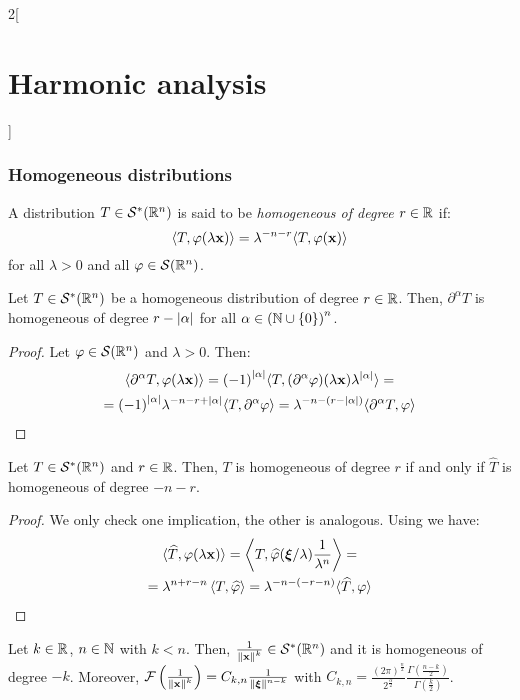 \documentclass[../../../main_math.tex]{subfiles}
\begin{document}
\begin{multicols}{2}[\section{Harmonic analysis}]
  \subsubsection{Homogeneous distributions}
  \begin{definition}
    A distribution $T\in \mathcal{S}^*(\mathbb{R}^n)$ is said to be \emph{homogeneous of degree $r\in \mathbb{R}$} if:
    $$
      \langle T,\varphi(\lambda\boldsymbol{\mathrm{x}})\rangle=\lambda^{- n -r}\langle T,\varphi(\boldsymbol{\mathrm{x}})\rangle
    $$
    for all $\lambda>0$ and all $\varphi\in \mathcal{S}(\mathbb{R}^n)$.
  \end{definition}
  \begin{proposition}
    Let $T\in \mathcal{S}^*(\mathbb{R}^n)$ be a homogeneous distribution of degree $r\in\mathbb{R}$. Then, $\partial^\alpha T$ is homogeneous of degree $r-\abs{\alpha}$ for all $\alpha\in{(\ensuremath{\mathbb{N}}\cup\{0\})}^n$.
  \end{proposition}
  \begin{proof}
    Let $\varphi\in \mathcal{S}(\mathbb{R}^n)$ and $\lambda>0$. Then:
    \begin{multline*}
      \langle \partial^\alpha T,\varphi(\lambda\boldsymbol{\mathrm{x}})\rangle={(-1)}^{\abs{\alpha}}\langle T,(\partial^\alpha\varphi)(\lambda\boldsymbol{\mathrm{x}})\lambda^{\abs{\alpha}}\rangle=\\={(-1)}^{\abs{\alpha}}\lambda^{-n-r+\abs{\alpha}}\langle T,\partial^\alpha\varphi\rangle=\lambda^{-n-(r-\abs{\alpha})}\langle \partial^\alpha T,\varphi\rangle
    \end{multline*}
  \end{proof}
  \begin{proposition}
    Let $T\in \mathcal{S}^*(\mathbb{R}^n)$ and $r\in \mathbb{R}$. Then, $T$ is homogeneous of degree $r$ if and only if $\widehat{T}$ is homogeneous of degree $-n-r$.
  \end{proposition}
  \begin{proof}
    We only check one implication, the other is analogous. Using  we have:
    \begin{multline*}
      \langle \widehat{T}, \varphi(\lambda\boldsymbol{\mathrm{x}})\rangle=\left\langle T, \widehat{\varphi}(\boldsymbol{\mathrm{\xi}}/\lambda)\frac{1}{\lambda^n}\right\rangle =\\=\lambda^{n+r - n}\left\langle T, \widehat{\varphi}\right\rangle=\lambda^{-n-(-r-n)}\langle \widehat{T}, \varphi\rangle
    \end{multline*}
  \end{proof}
  \begin{corollary}\label{lem:preRiesz2}
    Let $k\in\mathbb{R}$, $n\in\mathbb{N}$ with $k<n$. Then, $\frac{1}{\left\|\boldsymbol{\mathrm{x}}\right\|^k}\in \mathcal{S}^*(\mathbb{R}^n)$ and it is homogeneous of degree $-k$. Moreover, $\mathcal{F}\left(\frac{1}{\left\|\boldsymbol{\mathrm{x}}\right\|^k}\right) = C_{k,n}\frac{1}{\left\|\boldsymbol{\mathrm{\xi}}\right\|^{n-k}}$ with $C_{k,n}=\frac{{(2\pi)}^{\frac{n}{2}}}{{2}^{\frac{\alpha}{2}}}\frac{\Gamma\left(\frac{n-k}{2}\right)}{\Gamma\left(\frac{k}{2}\right)}$.
  \end{corollary}

\end{multicols}
\end{document}
